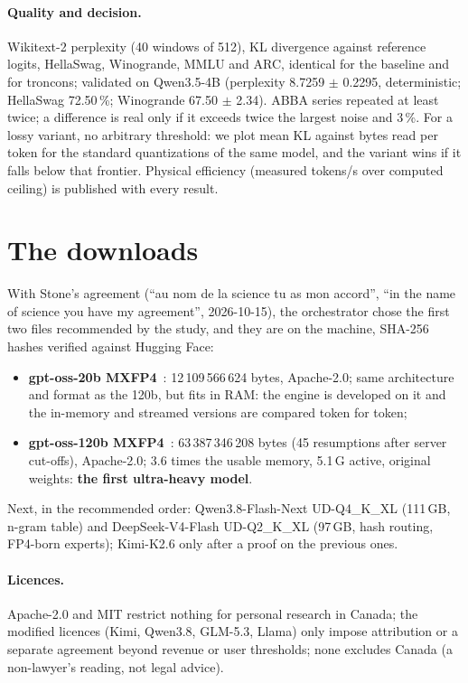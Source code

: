 \paragraph{Quality and decision.} Wikitext-2 perplexity (40 windows of 512), KL divergence against reference logits, HellaSwag, Winogrande, MMLU and ARC, identical for the baseline and for troncons; validated on Qwen3.5-4B (perplexity 8.7259 $\pm$ 0.2295, deterministic; HellaSwag 72.50\,\%; Winogrande 67.50 $\pm$ 2.34). ABBA series repeated at least twice; a difference is real only if it exceeds twice the largest noise and 3\,\%. For a lossy variant, no arbitrary threshold: we plot mean KL against bytes read per token for the standard quantizations of the same model, and the variant wins if it falls below that frontier. Physical efficiency (measured tokens/s over computed ceiling) is published with every result.

\section{The downloads}\label{sec:telechargements}

With Stone's agreement (\enquote{au nom de la science tu as mon accord}, \enquote{in the name of science you have my agreement}, 2026-10-15), the orchestrator chose the first two files recommended by the study, and they are on the machine, SHA-256 hashes verified against Hugging Face:
\begin{itemize}
\item \textbf{gpt-oss-20b MXFP4}~\cite{hfgptoss20b}: 12\,109\,566\,624 bytes, Apache-2.0; same architecture and format as the 120b, but fits in RAM: the engine is developed on it and the in-memory and streamed versions are compared token for token;
\item \textbf{gpt-oss-120b MXFP4}~\cite{hfgptoss120b}: 63\,387\,346\,208 bytes (45 resumptions after server cut-offs), Apache-2.0; 3.6 times the usable memory, 5.1\,G active, original weights: \textbf{the first ultra-heavy model}.
\end{itemize}
Next, in the recommended order: Qwen3.8-Flash-Next UD-Q4\_K\_XL (111\,GB, n-gram table) and DeepSeek-V4-Flash UD-Q2\_K\_XL (97\,GB, hash routing, FP4-born experts); Kimi-K2.6 only after a proof on the previous ones.

\paragraph{Licences.} Apache-2.0 and MIT restrict nothing for personal research in Canada; the modified licences (Kimi, Qwen3.8, GLM-5.3, Llama) only impose attribution or a separate agreement beyond revenue or user thresholds; none excludes Canada (a non-lawyer's reading, not legal advice).

